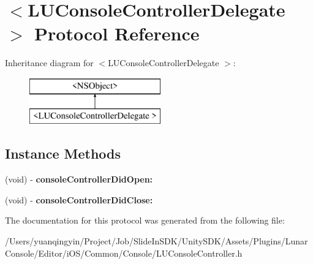 \hypertarget{protocol_l_u_console_controller_delegate_01-p}{}\section{$<$L\+U\+Console\+Controller\+Delegate $>$ Protocol Reference}
\label{protocol_l_u_console_controller_delegate_01-p}
Inheritance diagram for $<$L\+U\+Console\+Controller\+Delegate $>$\+:\begin{figure}[H]
\begin{center}
\leavevmode
\includegraphics[height=2.000000cm]{protocol_l_u_console_controller_delegate_01-p}
\end{center}
\end{figure}
\subsection*{Instance Methods}
\begin{DoxyCompactItemize}
\item 
\mbox{\label{protocol_l_u_console_controller_delegate_01-p_a5ee483d249b55ddd4fcebdb9df17c3d2}} 
(void) -\/ {\bfseries console\+Controller\+Did\+Open\+:}
\item 
\mbox{\label{protocol_l_u_console_controller_delegate_01-p_a553192b04b1846e4f8ca5ce2096eaae8}} 
(void) -\/ {\bfseries console\+Controller\+Did\+Close\+:}
\end{DoxyCompactItemize}


The documentation for this protocol was generated from the following file\+:\begin{DoxyCompactItemize}
\item 
/\+Users/yuanqingyin/\+Project/\+Job/\+Slide\+In\+S\+D\+K/\+Unity\+S\+D\+K/\+Assets/\+Plugins/\+Lunar\+Console/\+Editor/i\+O\+S/\+Common/\+Console/L\+U\+Console\+Controller.\+h\end{DoxyCompactItemize}
